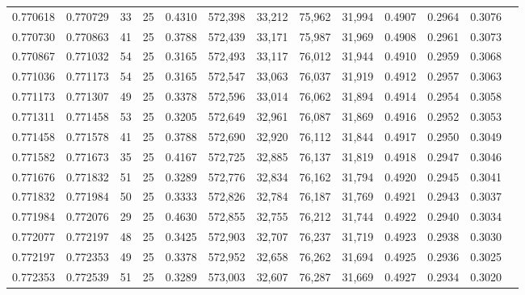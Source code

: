 \begin{tabular}{rrrrrrrrrrrrr}
0.770618 & 0.770729 &    33 &  25 &                                     0.4310 & 572,398 &  33,212 &  75,962 &  31,994 & 0.4907 & 0.2964 & 0.3076 \\
0.770730 & 0.770863 &    41 &  25 &                                     0.3788 & 572,439 &  33,171 &  75,987 &  31,969 & 0.4908 & 0.2961 & 0.3073 \\
0.770867 & 0.771032 &    54 &  25 &                                     0.3165 & 572,493 &  33,117 &  76,012 &  31,944 & 0.4910 & 0.2959 & 0.3068 \\
0.771036 & 0.771173 &    54 &  25 &                                     0.3165 & 572,547 &  33,063 &  76,037 &  31,919 & 0.4912 & 0.2957 & 0.3063 \\
0.771173 & 0.771307 &    49 &  25 &                                     0.3378 & 572,596 &  33,014 &  76,062 &  31,894 & 0.4914 & 0.2954 & 0.3058 \\
0.771311 & 0.771458 &    53 &  25 &                                     0.3205 & 572,649 &  32,961 &  76,087 &  31,869 & 0.4916 & 0.2952 & 0.3053 \\
0.771458 & 0.771578 &    41 &  25 &                                     0.3788 & 572,690 &  32,920 &  76,112 &  31,844 & 0.4917 & 0.2950 & 0.3049 \\
0.771582 & 0.771673 &    35 &  25 &                                     0.4167 & 572,725 &  32,885 &  76,137 &  31,819 & 0.4918 & 0.2947 & 0.3046 \\
0.771676 & 0.771832 &    51 &  25 &                                     0.3289 & 572,776 &  32,834 &  76,162 &  31,794 & 0.4920 & 0.2945 & 0.3041 \\
0.771832 & 0.771984 &    50 &  25 &                                     0.3333 & 572,826 &  32,784 &  76,187 &  31,769 & 0.4921 & 0.2943 & 0.3037 \\
0.771984 & 0.772076 &    29 &  25 &                                     0.4630 & 572,855 &  32,755 &  76,212 &  31,744 & 0.4922 & 0.2940 & 0.3034 \\
0.772077 & 0.772197 &    48 &  25 &                                     0.3425 & 572,903 &  32,707 &  76,237 &  31,719 & 0.4923 & 0.2938 & 0.3030 \\
0.772197 & 0.772353 &    49 &  25 &                                     0.3378 & 572,952 &  32,658 &  76,262 &  31,694 & 0.4925 & 0.2936 & 0.3025 \\
0.772353 & 0.772539 &    51 &  25 &                                     0.3289 & 573,003 &  32,607 &  76,287 &  31,669 & 0.4927 & 0.2934 & 0.3020 \\

\end{tabular}
